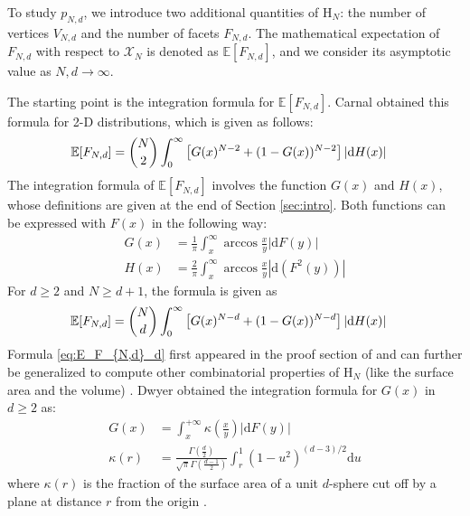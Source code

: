 \documentclass[conference,a4paper]{IEEEtran}
\def\E{\mathbb{E}}
\begin{document}
To study $p_{N,d}$, we introduce two additional quantities of $\mathrm{H}_N$: the number of vertices
$V_{N,d}$ and the number of facets $F_{N,d}$.
The mathematical expectation
of $F_{N,d}$ with respect to $\mathcal{X}_N$ is denoted as $\E[F_{N,d}]$, and we consider its asymptotic value as $N, d\to \infty$.

The starting point is the integration formula for $\E[F_{N,d}]$.
Carnal \cite{carnal1970konvexe}
obtained
this formula for 2-D distributions,
which is given as follows:
\begin{align}
     \E[F_{N,d}] &= \binom{N}{2} \int_0^{\infty} 
     \left[G(x)^{N-2} + (1-G(x))^{N-2} \right]|\mathrm{d} H(x)| 
     \label{eq:E_F_{N,d}_2_d}
\end{align}
The integration formula of $\E[F_{N,d}]$ involves the function $G(x)$ and $H(x)$,
whose definitions are given at the end of Section \ref{sec:intro}.
Both functions can be expressed with $F(x)$ in the following way:
\begin{align}
   G(x) &=\frac{1}{\pi} \int_x^{\infty}\arccos\frac{x}{y} |\mathrm{d} F(y)| \\
     H(x) &= \frac{2}{\pi} \int_x^{\infty} \arccos \frac{x}{y} |\mathrm{d}(F^2(y))|
     \label{eq:H_expression_2_dim}
\end{align}
For $d\geq 2$ and $N\geq d+1$, the formula is given as
\begin{align}
     \E[F_{N,d}] &= \binom{N}{d} \int_0^{\infty} 
     \left[G(x)^{N-d} + (1-G(x))^{N-d} \right]|\mathrm{d} H(x)| 
    \label{eq:E_F_{N,d}_d}
\end{align}
Formula \eqref{eq:E_F_{N,d}_d} first appeared in the proof section of \cite{raynaud1970enveloppe}
and can further be generalized to compute other combinatorial properties of $\mathrm{H}_N$ (like the surface area and the volume)
\cite{barany2008random}.
Dwyer obtained the integration formula for $G(x)$ in $d\geq 2$ as:
\begin{align}\label{eq:G_d_kappa}
     G(x) & = \int_x^{+\infty} \kappa \left(\frac{x}{y} \right) |\mathrm{d}F(y)| \\
     \kappa(r) & = \frac{\Gamma(\frac{d}{2})}
     {\sqrt{\pi}\Gamma(\frac{d-1}{2})}\int_r^{1}
     (1-u^2)^{(d-3)/2}\mathrm{d}u\label{eq:kappa_r}
\end{align}
where $\kappa(r)$ is the fraction of the surface area of a unit $d$-sphere
cut off by a plane at distance $r$ from the origin \cite{dwyer1991convex}.
\end{document}

